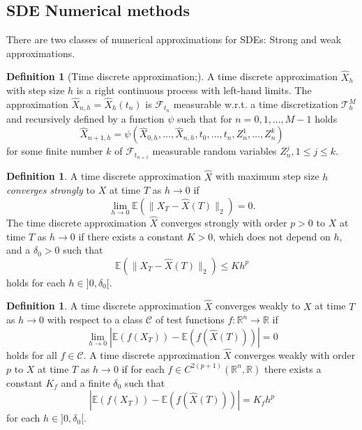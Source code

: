 \documentclass[12pt]{article}
\theoremstyle{definition}
\newtheorem{definition}[theorem]{Definition}
\numberwithin{equation}{section}
\newcommand{\norm}[1]{\lVert{#1}\rVert_2}
\begin{document}
\subsection{SDE Numerical methods}
\label{subsec:SdeNumericalMethods}
There are two classes of numerical approximations for SDEs: Strong and weak approximations. 
\begin{definition}[Time discrete approximation;]
  A time discrete approximation $\widehat{X}_h$ with step size $h$ is a right continuous process with left-hand limits. The approximation $\widehat{X}_{n,h} = \widehat{X}_h(t_n)$ is $\mathcal{F}_{t_n}$ measurable w.r.t. a time discretization $\mathcal{T}^M_h$ and recursively defined by a function $\psi$ such that for $n=0,1,\dots,M-1$ holds
  \begin{equation}
    \widehat{X}_{n+1, h} = \psi(\widehat{X}_{0,h}, \dots, \widehat{X}_{n,h}, t_0, \dots, t_n, Z^1_n,\dots, Z_n^k)
  \end{equation}
  for some finite number $k$ of $\mathcal{F}_{t_{n+1}}$ measurable random variables $Z^j_n, 1 \leq j \leq k$.
\end{definition}
\begin{definition}
  A time discrete approximation $\widehat{X}$ with maximum step size $h$ \emph{converges strongly} to $X$ at time $T$ as $h \rightarrow 0$ if 
  \begin{equation}
    \lim_{h \rightarrow 0} \mathbb{E}(\norm{X_T - \widehat{X}(T)}) = 0.
  \end{equation}
  The time discrete approximation $\widehat{X}$ converges strongly with order $p>0$ to $X$ at time $T$ as $h \rightarrow 0$ if there exists a constant $K > 0$, which does not depend on $h$, and a $\delta_0 > 0$ such that 
  \begin{equation}
    \mathbb{E}(\norm{X_T - \widehat{X}(T)}) \leq K h^p
  \end{equation}
  holds for each $h \in ]0, \delta_0[$.
\end{definition}

\begin{definition}
  A time discrete approximation $\widehat{X}$ converges weakly to $X$ at time $T$ as $h \rightarrow 0$ with respect to a class $\mathcal{C}$ of test functions $f: \mathbb{R}^n \rightarrow \mathbb{R}$ if 
  \begin{equation}
    \lim_{h \rightarrow 0} |\mathbb{E}(f(X_T)) - \mathbb{E}(f(\widehat{X}(T)))| = 0
  \end{equation}
  holds for all $f \in \mathcal{C}$.
  A time discrete approximation $\widehat{X}$ converges weakly with order $p$ to $X$ at time $T$ as $h \rightarrow 0$ if for each $f \in C^{2(p+1)}(\mathbb{R}^n, \mathbb{R})$ there exists a constant $K_f$ and a finite $\delta_0$ such that 
  \begin{equation}
     |\mathbb{E}(f(X_T)) - \mathbb{E}(f(\widehat{X}(T)))| = K_f h^p
  \end{equation}
  for each $h \in ]0, \delta_0[$.
\end{definition}
\end{document}
